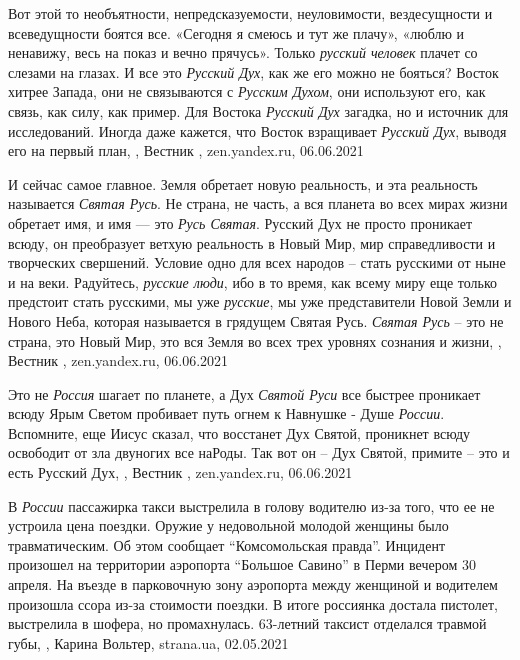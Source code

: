 Вот этой то необъятности, непредсказуемости, неуловимости, вездесущности и
всеведущности боятся все. «Сегодня я смеюсь и тут же плачу», «люблю и ненавижу,
весь на показ и вечно прячусь». Только \emph{русский человек} плачет со слезами на
глазах. И все это \emph{Русский Дух}, как же его можно не бояться?  Восток хитрее
Запада, они не связываются с \emph{Русским Духом}, они используют его, как связь, как
силу, как пример. Для Востока \emph{Русский Дух} загадка, но и источник для
исследований. Иногда даже кажется, что Восток взращивает \emph{Русский Дух}, выводя
его на первый план,
, Вестник , zen.yandex.ru, 06.06.2021

И сейчас самое главное. Земля обретает новую реальность, и эта реальность
называется \emph{Святая Русь}. Не страна, не часть, а вся планета во всех мирах жизни
обретает имя, и имя — это \emph{Русь Святая}. Русский Дух не просто проникает всюду,
он преобразует ветхую реальность в Новый Мир, мир справедливости и творческих
свершений. Условие одно для всех народов – стать русскими от ныне и на веки.
Радуйтесь, \emph{русские люди}, ибо в то время, как всему миру еще только предстоит
стать русскими, мы уже \emph{русские}, мы уже представители Новой Земли и Нового Неба,
которая называется в грядущем Святая Русь. \emph{Святая Русь} – это не страна, это
Новый Мир, это вся Земля во всех трех уровнях сознания и жизни,
, Вестник , zen.yandex.ru, 06.06.2021

Это не \emph{Россия} шагает по планете, а Дух \emph{Святой Руси} все быстрее проникает всюду
Ярым Светом пробивает путь огнем к Навнушке - Душе \emph{России}. Вспомните, еще Иисус
сказал, что восстанет Дух Святой, проникнет всюду освободит от зла двуногих все
наРоды. Так вот он – Дух Святой, примите – это и есть Русский Дух,
, Вестник , zen.yandex.ru, 06.06.2021

В \emph{России} пассажирка такси выстрелила в голову водителю из-за того, что ее не
устроила цена поездки. Оружие у недовольной молодой женщины было
травматическим.  Об этом сообщает \enquote{Комсомольская правда}.  Инцидент
произошел на территории аэропорта \enquote{Большое Савино} в Перми вечером 30
апреля. На въезде в парковочную зону аэропорта между женщиной и водителем
произошла ссора из-за стоимости поездки. В итоге россиянка достала пистолет,
выстрелила в шофера, но промахнулась. 63-летний таксист отделался травмой губы,
, Карина Вольтер, strana.ua, 02.05.2021


